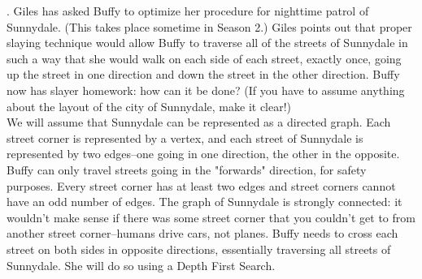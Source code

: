 \documentclass[11pt, solution, letterpaper]{format}
\begin{document}
. Giles has asked Buffy to optimize her procedure for nighttime patrol of Sunnydale. (This takes place sometime
in Season 2.) Giles points out that proper slaying technique would allow Buffy to traverse all of the streets of
Sunnydale in such a way that she would walk on each side of each street, exactly once, going up the street in
one direction and down the street in the other direction. Buffy now has slayer homework: how can it be done?
(If you have to assume anything about the layout of the city of Sunnydale, make it clear!)\\ 

We will assume that Sunnydale can be represented as a directed graph. Each street corner is represented by a vertex, and each street of Sunnydale is represented by two edges--one going in one direction, the other in the opposite. Buffy can only travel streets going in the "forwards" direction, for safety purposes. Every street corner has at least two edges and street corners cannot have an odd number of edges. The graph of Sunnydale is strongly connected: it wouldn't make sense if there was some street corner that you couldn't get to from another street corner--humans drive cars, not planes. Buffy needs to cross each street on both sides in opposite directions, essentially traversing all streets of Sunnydale. She will do so using a Depth First Search.\\ 
\end{document}
